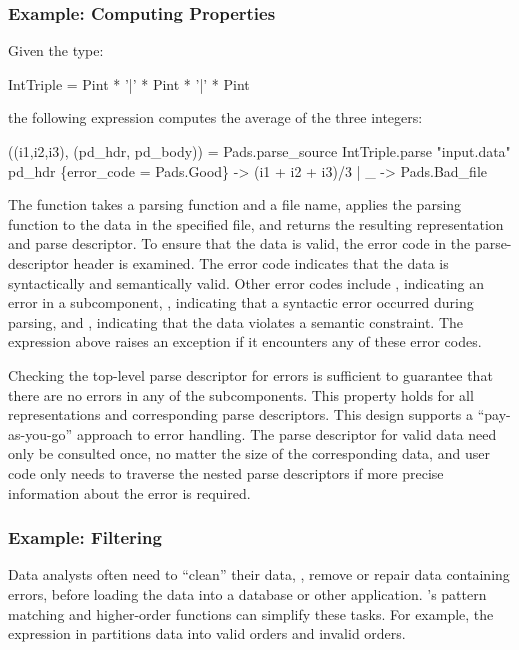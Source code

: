 \subsubsection{Example: Computing Properties}
\label{sec:ex-process}
Given the \padsml{} type:
\begin{code}\scriptsize
{} IntTriple = Pint * '|' * Pint * '|' * Pint\end{code}%
the following \ocaml{} expression computes the average of the three integers:
\begin{code}\scriptsize
{} ((i1,i2,i3), (pd_hdr, pd_body)) = 
 Pads.parse_source IntTriple.parse "input.data" 
 pd_hdr 
  \{error_code = Pads.Good\} -> (i1 + i2 + i3)/3
{|} _ ->  Pads.Bad_file \end{code}%
\noindent
The  function takes a parsing function and a file
name, applies the parsing function to the data in the specified file,
and returns the resulting representation and parse descriptor.  To
ensure that the data is valid, the error code in the parse-descriptor
header is examined.  The error code  indicates that the data
is syntactically and semantically valid. Other error codes include
, indicating an error in a subcomponent, , indicating
that a syntactic error occurred during parsing, and ,
indicating that the data violates a semantic constraint. The
expression above raises an exception if it encounters any of these
error codes.

Checking the top-level parse descriptor for errors is sufficient to
guarantee that there are no errors in any of the subcomponents.  This
property holds for all representations and corresponding parse
descriptors.  This design supports a ``pay-as-you-go'' approach to
error handling. The parse descriptor for valid data need only be
consulted once, no matter the size of the corresponding data, and user
code only needs to traverse the nested parse descriptors if more
precise information about the error is required.

\subsubsection{Example: Filtering}
\label{sec:ex-filter}

Data analysts often need to ``clean'' their data, \ie{}, remove or
repair data containing errors, before loading the data into a database
or other application.  \ocaml{}'s pattern matching and higher-order
functions can simplify these tasks.  For example, the expression in
 partitions \dibbler{} data into valid
orders and invalid orders.  

